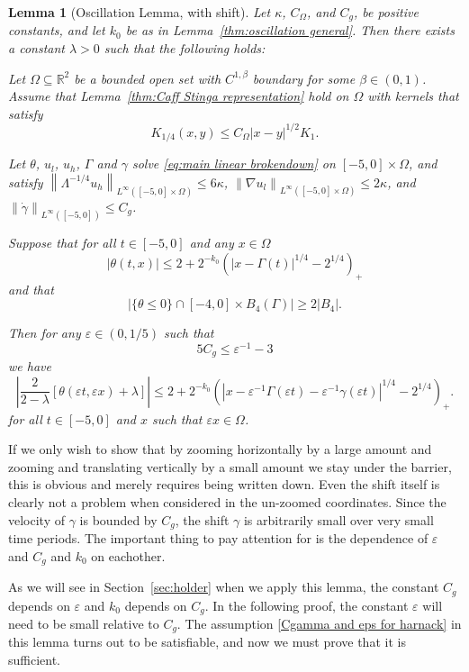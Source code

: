 \documentclass[11pt]{amsart}
\newtheorem{lemma}[theorem]{Lemma}
\theoremstyle{remark}
\theoremstyle{definition}
\newcommand{\R}{\mathbb{R}}
\newcommand{\eps}{\varepsilon}
\newcommand{\norm}[1]{\left\lVert#1\right\rVert}
\newcommand{\paren}[1]{\left( #1 \right)}
\newcommand{\bracket}[1]{\left[ #1 \right]}
\newcommand{\abs}[1]{\left\lvert #1 \right\rvert}
\newcommand{\grad}{\nabla}
\newcommand{\n}{^{-1}}
\newcommand{\ulow}{u_l}
\newcommand{\uhigh}{u_h}
\newcommand{\Cgamma}{C_g}
\newcommand{\Comega}{C_\Omega}
\begin{document}
\begin{lemma}[Oscillation Lemma, with shift] \label{thm:oscillation shifted}
Let $\kappa$, $\Comega$, and $\Cgamma$, be positive constants, and let $k_0$ be as in Lemma~\ref{thm:oscillation general}.  Then there exists a constant $\lambda > 0$ such that the following holds:

Let $\Omega \subseteq \R^2$ be a bounded open set with $C^{1,\beta}$ boundary for some $\beta \in (0,1)$.  Assume that Lemma~\ref{thm:Caff Stinga representation} hold on $\Omega$ with kernels that satisfy
\[ K_{1/4}(x,y) \leq \Comega |x-y|^{1/2} K_{1}. \]

Let $\theta$, $\ulow$, $\uhigh$, $\Gamma$ and $\gamma$ solve \eqref{eq:main linear brokendown} on $[-5,0]\times\Omega$, and satisfy $\norm{\Lambda^{-1/4} \uhigh}_{L^\infty([-5,0]\times\Omega)} \leq 6 \kappa$, $\norm{\grad \ulow}_{L^\infty([-5,0]\times\Omega)} \leq 2\kappa$, and $\norm{\dot{\gamma}}_{L^\infty([-5,0])} \leq \Cgamma$.  

Suppose that for all $t \in [-5,0]$ and any $x \in \Omega$
\begin{equation} \label{theta bounded everywhere} |\theta(t,x)| \leq 2 + 2^{-k_0} \paren{|x-\Gamma(t)|^{1/4}-2^{1/4}}_+ \end{equation}
and that
\[ \abs{\{\theta \leq 0\} \cap [-4,0]\times B_4(\Gamma)} \geq 2|B_4|. \]

Then for any $\eps \in (0,1/5)$ such that
\begin{equation} \label{Cgamma and eps for harnack} 5 \Cgamma \leq \eps\n - 3 \end{equation}
we have
\[ \abs{\frac{2}{2-\lambda} \bracket{\theta(\eps t, \eps x) + \lambda}} \leq 2 + 2^{-k_0} \paren{|x-\eps\n\Gamma(\eps t)-\eps\n\gamma(\eps t)|^{1/4}-2^{1/4}}_+. \]
for all $t \in [-5,0]$ and $x$ such that $\eps x \in \Omega$.  
\end{lemma}

If we only wish to show that by zooming horizontally by a large amount and zooming and translating vertically by a small amount we stay under the barrier, this is obvious and merely requires being written down.  Even the shift itself is clearly not a problem when considered in the un-zoomed coordinates.  Since the velocity of $\gamma$ is bounded by $\Cgamma$, the shift $\gamma$ is arbitrarily small over very small time periods.  The important thing to pay attention for is the dependence of $\eps$ and $\Cgamma$ and $k_0$ on eachother.  

As we will see in Section~\ref{sec:holder} when we apply this lemma, the constant $\Cgamma$ depends on $\eps$ and $k_0$ depends on $\Cgamma$.  In the following proof, the constant $\eps$ will need to be small relative to $\Cgamma$.  The assumption \eqref{Cgamma and eps for harnack} in this lemma turns out to be satisfiable, and now we must prove that it is sufficient.  
\end{document}
